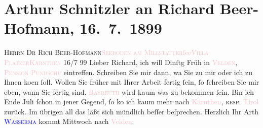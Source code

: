 

               \section[Arthur Schnitzler an Richard Beer-Hofmann, 16. 7. 1899]{ Arthur Schnitzler an Richard Beer-Hofmann, 16. 7. 1899}\nopagebreak{}\rehead{ }\normalsize\beginnumbering{} \toendnotes[C]{\smallbreak\pagebreak[2]} 
\pstart{}{\pb}\textsc{Herrn Dr Rich Beer-Hofmann}\pend{}\pstart{}\textcolor{pink}{\textsc{Seeboden am Millstätter}ſee}{}\ledrightnote{\textcolor{pink}{Seeboden}}\pend{}\pstart{}\textcolor{pink}{\textsc{Villa Platzer}}{}\ledrightnote{\textcolor{pink}{Villa Platzer}}\pend{}\pstart{}\textcolor{pink}{\textsc{Kärnthen}}{}\ledrightnote{\textcolor{pink}{Kärnten}}\pend{}{\bigskip}\pstart
           \raggedleft{}{\pb}16/7 99\pend
           \pstart
           Lieber Richard, ich will Dinſtg{ }Früh in \textcolor{pink}{\textsc{Velden}}{}\ledrightnote{\textcolor{pink}{Velden}}, \textcolor{pink}{\textsc{Pension Pundschu}}{}\ledrightnote{\textcolor{pink}{Pension Pundschu}} eintreffen. Schreiben Sie mir dann, wa{\geminationn} Sie zu mir oder ich zu Ihnen ko{\geminationm}en ſoll. {\pb}Wollen Sie
               früher mit Ihrer Arbeit fertig ſein, ſo ſchreiben Sie mir eben, wann Sie fertig
               sind.\pend
           \pstart
           \textcolor{pink}{\textsc{Bayreuth}}{}\ledrightnote{\textcolor{pink}{Bayreuth}} wird kaum {\pb}was zu bekommen ſein.\pend
           \pstart
           Bin ich Ende Juli{ }ſchon in jener Gegend, ſo ko{\geminationm} ich kaum mehr nach \textcolor{pink}{Kärnthen}{}\ledrightnote{\textcolor{pink}{Kärnten}}, \textsc{resp}. \textcolor{pink}{Tirol}{}\ledrightnote{\textcolor{pink}{Tirol}} zurück. Im übrigen all das läßt sich mündlich {\pb}beſſer beſprechen.\pend
           \pstart Herzlich Ihr \spacefill\mbox{Arth}\pend{}\pstart
           \textcolor{blue}{\textsc{Wasserma{\geminationn}}}{}\ledrightnote{\textcolor{blue}{Jakob Wassermann}} kommt Mittwoch nach \textcolor{pink}{Velden}{}\ledrightnote{\textcolor{pink}{Velden}}.\pend
           \endnumbering{}  
      